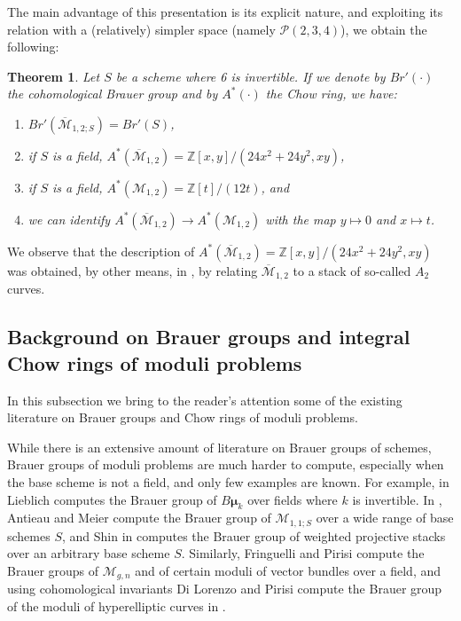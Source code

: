 \documentclass[11pt]{amsart}
\newtheorem{theorem}{Theorem}[section]
\theoremstyle{definition}
\theoremstyle{remark}
\newcommand{\calM}{\mathcal M}
\newcommand{\calP}{\mathcal P}
\newcommand{\bmu}{\boldsymbol{\mu}}
\begin{document}
The main advantage of this presentation is its explicit nature, and exploiting its relation with a (relatively) simpler space (namely $\calP(2,3,4)$), we obtain the following:

\begin{theorem}Let $S$ be a scheme where 6 is invertible.
If we denote by $Br'(\cdot)$ the cohomological Brauer group and by $A^*(\cdot)$ the Chow ring, we have:
\begin{enumerate}
    \item $Br'(\overline{\calM}_{1,2;S}) = Br'(S)$,
    \item if $S$ is a field, $A^*(\overline{\calM}_{1,2}) = \mathbb{Z}[x,y]/(24x^2 + 24 y^2, xy)$, 
    \item if $S$ is a field, $A^*(\calM_{1,2}) = \mathbb{Z}[t]/(12t)$, and
    \item we can identify $A^*(\overline{\calM}_{1,2}) \to A^*(\calM_{1,2})$ with the map $y\mapsto 0$ and $x\mapsto t$.
\end{enumerate}
\end{theorem}
We observe that the description of $A^*(\overline{\calM}_{1,2}) = \mathbb{Z}[x,y]/(24x^2 + 24 y^2, xy)$ was obtained, by other means, in \cite[Theorem 2.6]{di2021stable}, by relating $\overline{\calM}_{1,2}$ to a stack of so-called $A_2$ curves.

\subsection{Background on Brauer groups and integral Chow rings of moduli problems}
In this subsection we bring to the reader's attention some of the existing literature on Brauer groups and Chow rings of moduli problems.


While there is an extensive amount of literature on Brauer groups of schemes, Brauer groups of moduli problems are much harder to compute, especially when the base scheme is not a field, and only few examples are known. For example, in \cite{period_index_max} Lieblich computes the Brauer group of $B\bmu_k$ over fields where $k$ is invertible. In \cite{Brauer_group_m11}, Antieau and Meier compute the Brauer group of $\calM_{1,1;S}$ over a wide range of base schemes $S$, and Shin in \cite{Minseon} computes the Brauer group of weighted projective stacks over an arbitrary base scheme $S$. Similarly, Fringuelli and Pirisi \cite{FringuelliPirisi} compute the Brauer groups of $\calM_{g,n}$ and of certain moduli of vector bundles over a field, and using cohomological invariants Di Lorenzo and Pirisi compute the Brauer group of the moduli of hyperelliptic curves in \cite{DLP}.
\end{document}
